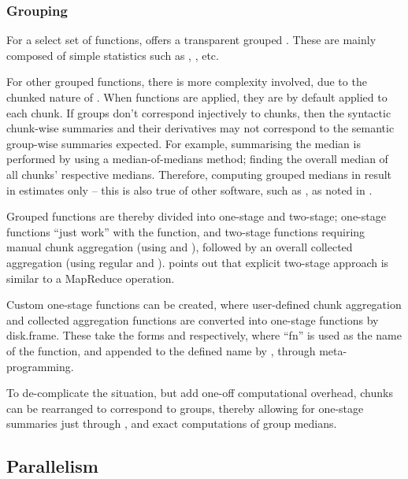 \subsubsection{Grouping}\label{sec:spec-cons-group-by}

For a select set of functions,  offers a transparent grouped
. These are mainly composed
of simple statistics such as ,
, etc.

For other grouped functions, there is more complexity involved, due to
the chunked nature of . When functions are applied, they are
by default applied to each chunk. If groups don't correspond injectively
to chunks, then the syntactic chunk-wise summaries and their derivatives
may not correspond to the semantic group-wise summaries expected. For
example, summarising the median is performed by using a
median-of-medians method; finding the overall median of all chunks'
respective medians. Therefore, computing grouped medians in 
result in estimates only -- this is also true of other software, such
as , as noted in \cite{zj19:_group_by}.

Grouped functions are thereby divided into one-stage and two-stage;
one-stage functions ``just work'' with the
 function, and two-stage
functions requiring manual chunk aggregation (using
 and ), followed by an
overall collected aggregation (using regular
 and
). \Textcite{zj19:_group_by}
points out that explicit two-stage approach is similar to a MapReduce
operation.

Custom one-stage functions can be created, where user-defined chunk
aggregation and collected aggregation functions are converted into
one-stage functions by
disk.frame\cite{zj19:_custom_one_stage_group_by_funct}. These take
the forms
 and
respectively, where ``fn'' is used as the name of the function,
and appended to the defined name by , through
meta-programming.

To de-complicate the situation, but add one-off computational overhead,
chunks can be rearranged to correspond to groups, thereby allowing for
one-stage summaries just through
, and exact
computations of group medians.

\subsection{Parallelism}\label{sec:parallelisation}


